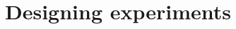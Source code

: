 \documentclass[final]{beamer}%
\begin{document}
%
%
%
%
%
%
%
%

\section{Designing experiments}

\end{document}
